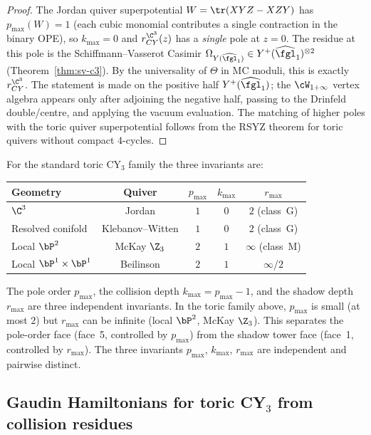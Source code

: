 \begin{proof}
The Jordan quiver superpotential $W = \tr(XYZ - XZY)$ has
$p_{\max}(W) = 1$ (each cubic monomial contributes a single contraction
in the binary OPE), so $k_{\max} = 0$ and $r_{CY}^{\C^3}(z)$ has a
\emph{single} pole at $z = 0$. The residue at this pole is the
Schiffmann--Vasserot Casimir
$\Omega_{Y(\widehat{\fgl}_1)} \in Y^+(\widehat{\fgl}_1)^{\otimes 2}$
(Theorem~\ref{thm:sv-c3}). By the universality of $\Theta$ in MC moduli,
this is exactly $r_{CY}^{\C^3}$. The statement is made on the positive
half \(Y^+(\widehat{\fgl}_1)\); the \(\cW_{1+\infty}\) vertex algebra
appears only after adjoining the negative half, passing to the
Drinfeld double/centre, and applying the vacuum evaluation. The matching
of higher poles with the toric quiver superpotential follows from the
RSYZ theorem for toric quivers without compact $4$-cycles.
\end{proof}

\begin{remark}
\label{rem:toric-three-invariants}
For the standard toric CY$_3$ family the three invariants are:
\begin{center}
\small
\begin{tabular}{lcccc}
\toprule
Geometry & Quiver & $p_{\max}$ & $k_{\max}$ & $r_{\max}$ \\
\midrule
$\C^3$ & Jordan & $1$ & $0$ & $2$ (class~G) \\
Resolved conifold & Klebanov--Witten & $1$ & $0$ & $2$ (class~G) \\
Local $\bP^2$ & McKay $\Z_3$ & $2$ & $1$ & $\infty$ (class~M) \\
Local $\bP^1\times\bP^1$ & Beilinson & $2$ & $1$ & $\infty$/$2$ \\
\bottomrule
\end{tabular}
\end{center}
The pole order $p_{\max}$, the collision depth $k_{\max} = p_{\max} - 1$,
and the shadow depth $r_{\max}$ are three independent invariants. In the
toric family above, $p_{\max}$ is small (at most $2$) but $r_{\max}$ can
be infinite (local $\bP^2$, McKay $\Z_3$). This separates the pole-order
face (face~5, controlled by $p_{\max}$) from the shadow tower face
(face~1, controlled by $r_{\max}$). The three invariants $p_{\max}$, $k_{\max}$, $r_{\max}$ are independent and pairwise distinct.
\end{remark}

\subsection{Gaudin Hamiltonians for toric CY\texorpdfstring{$_3$}{-3} from collision residues}
\label{subsec:toric-gaudin-from-collisions}

